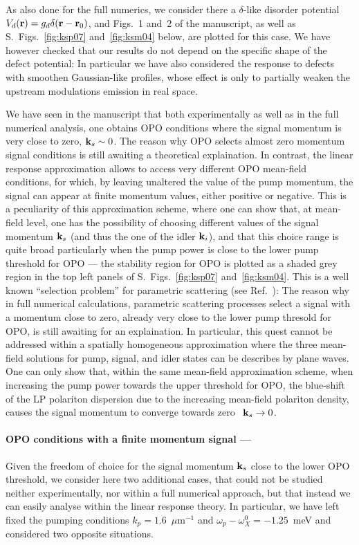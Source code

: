 As also done for the full numerics, we
consider there a $\delta$-like disorder potential $V_d(\mathbf{r}) = g_d
\delta(\mathbf{r} - \mathbf{r}_0)$, and Figs.~1 and~2 of the manuscript,
as well as S.~Figs.~\ref{fig:ksp07} and~\ref{fig:ksm04} below, are
plotted for this case.
%
We have however checked that our results do not depend on the specific
shape of the defect potential: In particular we have also considered
the response to defects with smoothen Gaussian-like profiles, whose
effect is only to partially weaken the upstream modulations emission
in real space.

We have seen in the manuscript that both experimentally as well as in
the full numerical analysis, one obtains OPO conditions where the
signal momentum is very close to zero, $\mathbf{k}_s \sim 0$. The reason
why OPO selects almost zero momentum signal conditions is still
awaiting a theoretical explaination.
%
In contrast, the linear response approximation allows to access very
different OPO mean-field conditions, for which, by leaving unaltered
the value of the pump momentum, the signal can appear at finite
momentum values, either positive or negative.
%
This is a peculiarity of this approximation scheme, where one can show
that, at mean-field level, one has the possibility of choosing
different values of the signal momentum $\mathbf{k}_s$ (and thus the one
of the idler $\mathbf{k}_i$), and that this choice range is quite broad
particularly when the pump power is close to the lower pump threshold
for OPO --- the stability region for OPO is plotted as a shaded grey
region in the top left panels of S.~Figs.~\ref{fig:ksp07}
and~\ref{fig:ksm04}. This is a well known ``selection problem'' for
parametric scattering (see Ref.~\cite{Wouters_2007_b}): The reason why
in full numerical calculations, parametric scattering processes select
a signal with a momentum close to zero, already very close to the
lower pump thresold for OPO, is still awaiting for an explaination. In
particular, this quest cannot be addressed within a spatially
homogeneous approximation where the three mean-field solutions for
pump, signal, and idler states can be describes by plane waves.
One can only show that, within the same mean-field approximation
scheme, when increasing the pump power towards the upper threshold for
OPO, the blue-shift of the LP polariton dispersion due to the
increasing mean-field polariton density, causes the signal momentum to
converge towards zero~\cite{Whittaker_2005} $\mathbf{k}_s \rightarrow 0$.

\paragraph{OPO conditions with a finite momentum signal ---}
%
Given the freedom of choice for the signal momentum $\mathbf{k}_s$ close
to the lower OPO threshold, we consider here two additional cases,
that could not be studied neither experimentally, nor within a full
numerical approach, but that instead we can easily analyse within the
linear response theory.
%
In particular, we have left fixed the pumping conditions
$k_p=1.6$~$\mu$m$^{-1}$ and $\omega_p-\omega_X^0=-1.25$~meV and
considered two opposite situations.


